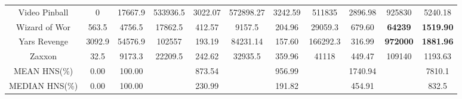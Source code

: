 \documentclass[nohyperref]{article}
\def\GDIImeanhns{7810.1}
\def\GDIImedianhns{832.5}
\def\rainbowmeanhns{873.54}
\def\rainbowmedianhns{230.99}
\def\impalameanhns{956.99}
\def\impalamedianhns{191.82}
\def\lasermeanhns{1740.94}
\def\lasermedianhns{454.91}
\newcommand{\best}[1]{\textbf{#1}}
\theoremstyle{plain}
\begin{document}
\begin{table}[!hb]
\begin{center}
\begin{tabular}{ |c| c| c| c c| c c| c c| c c| }
 Video Pinball & 0 & 17667.9        & 533936.5 & 3022.07 & 572898.27 & 3242.59 & 511835 & 2896.98                   &925830     &5240.18                   \\
 Wizard of Wor & 563.5 & 4756.5     & 17862.5 & 412.57 & 9157.5    & 204.96  & 29059.3 & 679.60                     &\best{64239 }     &\best{1519.90 }    \\
 Yars Revenge & 3092.9 & 54576.9    & 102557 & 193.19 & 84231.14  & 157.60 & 166292.3  & 316.99                     &\textbf{972000}     &\textbf{1881.96}       \\
 Zaxxon       & 32.5   & 9173.3     & 22209.5 & 242.62 & 32935.5   & 359.96 & 41118    & 449.47                     &109140     &1193.63       \\
\hline
MEAN HNS(\%)        &     0.00 & 100.00   &         & \rainbowmeanhns &         & \impalameanhns  &        & \lasermeanhns &      & \GDIImeanhns        \\
\hline
MEDIAN HNS(\%)      & 0.00   & 100.00   &         & \rainbowmedianhns &         &  \impalamedianhns  &        & \lasermedianhns  &      & \GDIImedianhns        \\
\hline
\end{tabular}
\end{center}
\end{table}
\clearpage
\end{document}
